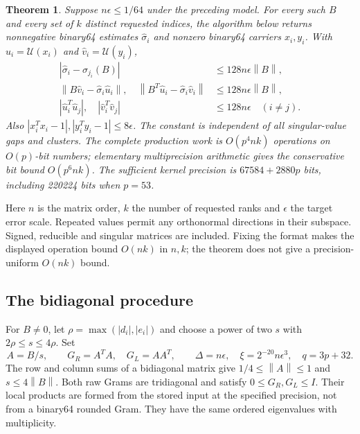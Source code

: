 \documentclass[11pt]{article}
\newtheorem{theorem}{Theorem}[section]
\theoremstyle{remark}\newtheorem{remark}[theorem]{Remark}
\newcommand{\norm}[1]{\left\lVert#1\right\rVert}
\newcommand{\abs}[1]{\left\lvert#1\right\rvert}
\newcommand{\unit}[1]{\mathcal U(#1)}
\begin{document}
\begin{theorem}\label{thm:main}
Suppose $n\epsilon\le1/64$ under the preceding model. For every such $B$ and
every set of $k$ distinct requested indices, the algorithm below returns
nonnegative binary64 estimates $\widehat\sigma_i$ and nonzero binary64
carriers $x_i,y_i$. With $\widehat u_i=\unit{x_i}$ and
$\widehat v_i=\unit{y_i}$,
\begin{align}
 \abs{\widehat\sigma_i-\sigma_{j_i}(B)}&\le128n\epsilon\norm B,\label{eq:value}\\
 \norm{B\widehat v_i-\widehat\sigma_i\widehat u_i},\quad
 \norm{B^T\widehat u_i-\widehat\sigma_i\widehat v_i}
   &\le128n\epsilon\norm B,\label{eq:res}\\
 \abs{\widehat u_i^T\widehat u_j},\quad
 \abs{\widehat v_i^T\widehat v_j}&\le128n\epsilon\quad(i\ne j).\label{eq:orth}
\end{align}
Also $\abs{x_i^Tx_i-1},\abs{y_i^Ty_i-1}\le8\epsilon$.
The constant is independent of all singular-value gaps and clusters.
The complete production work is $O(p^4nk)$ operations on $O(p)$-bit numbers;
elementary multiprecision arithmetic gives the conservative bit bound
$O(p^6nk)$. The sufficient kernel precision is $67584+2880p$ bits, including
220224 bits when $p=53$.
\end{theorem}

Here $n$ is the matrix order, $k$ the number of requested ranks and $\epsilon$
the target error scale. Repeated values permit any orthonormal directions in
their subspace. Signed, reducible and singular matrices are included. Fixing
the format makes the displayed operation bound $O(nk)$ in $n,k$; the theorem
does not give a precision-uniform $O(nk)$ bound.

\subsection{The bidiagonal procedure}
For $B\ne0$, let $\rho=\max(\abs{d_i},\abs{e_i})$ and choose a power of two
$s$ with $2\rho\le s\le4\rho$. Set
\begin{equation}\label{eq:scales}
 A=B/s,\qquad G_R=A^TA,\quad G_L=AA^T,\qquad
 \Delta=n\epsilon,\quad \xi=2^{-20}n\epsilon^3,\quad q=3p+32.
\end{equation}
The row and column sums of a bidiagonal matrix give
$1/4\le\norm A\le1$ and $s\le4\norm B$. Both raw Grams are tridiagonal
and satisfy $0\le G_R,G_L\le I$. Their local products are formed from the
stored input at the specified precision, not from a binary64 rounded Gram.
They have the same ordered eigenvalues with multiplicity.
\end{document}
